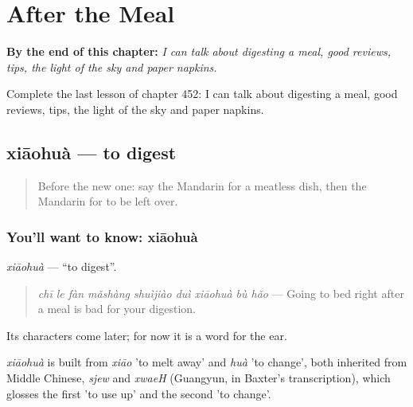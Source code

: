 
\chapter{After the Meal}
\label{ch:zh-after-the-meal}

\begin{chapteropening}
\textbf{By the end of this chapter:} \emph{I can talk about digesting a meal, good reviews, tips, the light of the sky and paper napkins.}

Complete the last lesson of chapter 452: I can talk about digesting a meal, good reviews, tips, the light of the sky and paper napkins.
\end{chapteropening}

\section[xiāohuà]{xiāohuà — to digest}

\label{lesson:ZH-C452-xiaohua}



\begin{quote}
Before the new one: say the Mandarin for a meatless dish, then the Mandarin for to be left over.
\end{quote}

\subsection*{You'll want to know: xiāohuà}
\emph{xiāohuà} — \textquotedblleft{}to digest\textquotedblright{}.

\begin{quote}
\emph{chī le fàn mǎshàng shuìjiào duì xiāohuà bù hǎo} — Going to bed right after a meal is bad for your digestion.
\end{quote}

Its characters come later; for now it is a word for the ear.

\begin{cousinweb}
\emph{xiāohuà} is built from \emph{xiāo} 'to melt away' and \emph{huà} 'to change', both inherited from Middle Chinese, \emph{sjew} and \emph{xwaeH} (Guangyun, in Baxter's transcription), which glosses the first 'to use up' and the second 'to change'.
\end{cousinweb}


